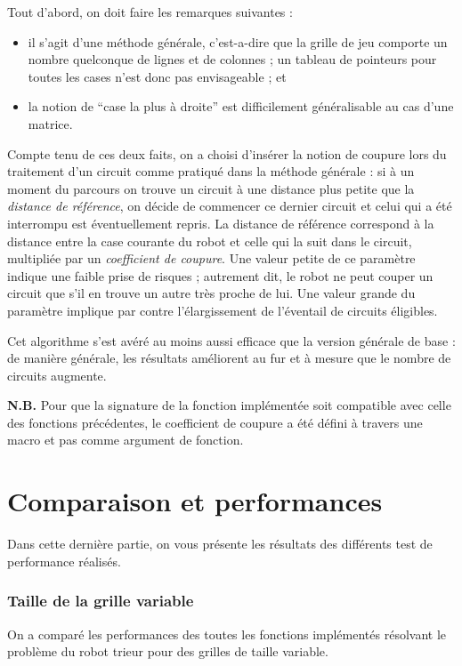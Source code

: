 \documentclass[12pt,a4paper]{article}
\begin{document}
Tout d'abord, on doit faire les remarques suivantes : 
\begin{itemize}
  \item il s'agit d'une m\'ethode g\'en\'erale, c'est-a-dire que la grille de 
jeu comporte un nombre quelconque de lignes et de colonnes ; un tableau de 
pointeurs pour toutes les cases n'est donc pas envisageable ; et
\item la notion de \enquote{case la plus \`a droite} est difficilement 
g\'en\'eralisable au cas d'une matrice.
\end{itemize}

Compte tenu de ces deux faits, on a choisi d'ins\'erer la notion de coupure 
lors du traitement d'un circuit comme pratiqu\'e dans la m\'ethode g\'en\'erale 
: si \`a un moment du parcours on trouve un circuit \`a une distance plus 
petite que la {\itshape distance de r\'ef\'erence}, on d\'ecide de 
commencer ce dernier circuit et celui qui a \'et\'e interrompu est 
\'eventuellement repris. La distance de r\'ef\'erence correspond \`a la 
distance entre la case courante du robot et celle qui la suit dans le circuit, 
multipli\'ee par un {\itshape coefficient de coupure}. Une valeur petite de 
ce param\`etre indique une faible prise de risques ; autrement dit, le robot ne 
peut couper un circuit que s'il en trouve un autre tr\`es proche de lui. Une 
valeur grande du param\`etre implique par contre l'\'elargissement de 
l'\'eventail de circuits \'eligibles.

Cet algorithme s'est av\'er\'e au moins aussi efficace que la version 
g\'en\'erale de base : de mani\`ere g\'en\'erale, les r\'esultats 
am\'eliorent au fur et \`a mesure que le nombre de circuits augmente.

{\bfseries N.B.} Pour que la signature de la fonction impl\'ement\'ee soit 
compatible avec celle des fonctions pr\'ec\'edentes, le coefficient de coupure a 
\'et\'e d\'efini \`a travers une macro et pas comme argument de fonction.

\newpage

\part{Comparaison et performances}
Dans cette derni\`ere partie, on vous pr\'esente les r\'esultats des 
diff\'erents test de performance r\'ealis\'es.

\section{Taille de la grille variable}
On a compar\'e les performances des toutes les fonctions 
impl\'ement\'es r\'esolvant le probl\`eme du robot trieur pour des grilles de 
taille variable.
\end{document}
